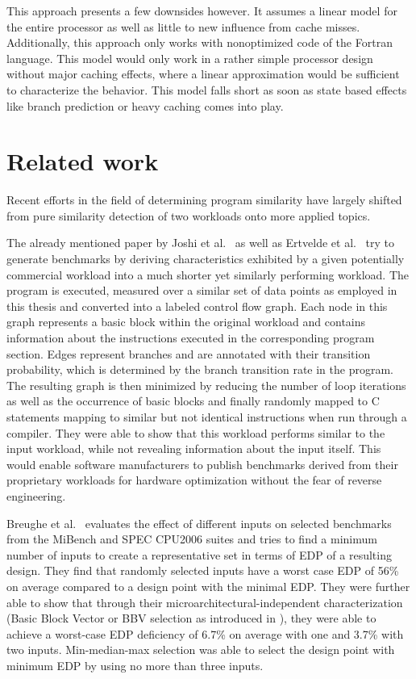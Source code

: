 \documentclass[../bachelor_paper.tex]{subfiles}
\begin{document}
This approach presents a few downsides however. It assumes a linear model for the entire processor as well as little to new influence from cache misses. Additionally, this approach only works with nonoptimized code of the Fortran language. This model would only work in a rather simple processor design without major caching effects, where a linear approximation would be sufficient to characterize the behavior. This model falls short as soon as state based effects like branch prediction or heavy caching comes into play.

\section{Related work}
	\label{sec:prob/rel}

Recent efforts in the field of determining program similarity have largely shifted from pure similarity detection of two workloads onto more applied topics. 

The already mentioned paper by Joshi et al.\ \cite{joshiDistillingEssenceProprietary2008} as well as Ertvelde et al.\ \cite{vanertveldeBenchmarkSynthesisArchitecture2010} try to generate benchmarks by deriving characteristics exhibited by a given potentially commercial workload into a much shorter yet similarly performing workload. The program is executed, measured over a similar set of data points as employed in this thesis and converted into a labeled control flow graph. Each node in this graph represents a basic block within the original workload and contains information about the instructions executed in the corresponding program section. Edges represent branches and are annotated with their transition probability, which is determined by the branch transition rate in the program. The resulting graph is then minimized by reducing the number of loop iterations as well as the occurrence of basic blocks and finally randomly mapped to C statements mapping to similar but not identical instructions when run through a compiler. They were able to show that this workload performs similar to the input workload, while not revealing information about the input itself. This would enable software manufacturers to publish benchmarks derived from their proprietary workloads for hardware optimization without the fear of reverse engineering.

Breughe et al.\ \cite{breugheSelectingRepresentativeBenchmark2013} evaluates the effect of different inputs on selected benchmarks from the MiBench and SPEC CPU2006 suites and tries to find a minimum number of inputs to create a representative set in terms of \ac{EDP} of a resulting design. They find that randomly selected inputs have a worst case \ac{EDP} of 56\% on average compared to a design point with the minimal \ac{EDP}. They were further able to show that through their microarchitectural-independent characterization (Basic Block Vector or BBV selection as introduced in \cite{sherwoodBasicBlockDistribution2001}), they were able to achieve a worst-case \ac{EDP} deficiency of 6.7\% on average with one and 3.7\% with two inputs. Min-median-max selection was able to select the design point with minimum \ac{EDP} by using no more than three inputs.
\end{document}
